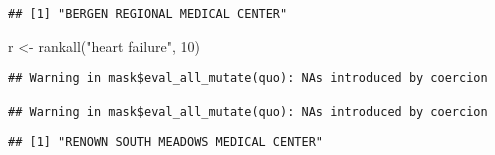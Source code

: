 \documentclass[
]{article}
\newenvironment{Shaded}{\begin{snugshade}}{\end{snugshade}}
\newcommand{\DecValTok}[1]{\textcolor[rgb]{0.00,0.00,0.81}{#1}}
\newcommand{\FunctionTok}[1]{\textcolor[rgb]{0.00,0.00,0.00}{#1}}
\newcommand{\NormalTok}[1]{#1}
\newcommand{\OtherTok}[1]{\textcolor[rgb]{0.56,0.35,0.01}{#1}}
\newcommand{\SpecialCharTok}[1]{\textcolor[rgb]{0.00,0.00,0.00}{#1}}
\newcommand{\StringTok}[1]{\textcolor[rgb]{0.31,0.60,0.02}{#1}}
\begin{document}
\begin{verbatim}
## [1] "BERGEN REGIONAL MEDICAL CENTER"
\end{verbatim}

\begin{Shaded}
\begin{Highlighting}[]
\NormalTok{r }\OtherTok{\textless{}{-}} \FunctionTok{rankall}\NormalTok{(}\StringTok{"heart failure"}\NormalTok{, }\DecValTok{10}\NormalTok{)}
\end{Highlighting}
\end{Shaded}

\begin{verbatim}
## Warning in mask$eval_all_mutate(quo): NAs introduced by coercion

## Warning in mask$eval_all_mutate(quo): NAs introduced by coercion
\end{verbatim}

\begin{Shaded}
\end{Shaded}

\begin{verbatim}
## [1] "RENOWN SOUTH MEADOWS MEDICAL CENTER"
\end{verbatim}
\end{document}
